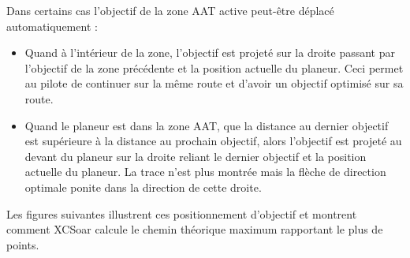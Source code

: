Dans certains cas l'objectif de la zone AAT active peut-être déplacé automatiquement :
\begin{itemize}
\item Quand à l'intérieur de la zone, l'objectif est projeté sur la droite passant par l'objectif de la zone précédente et la position actuelle du planeur. Ceci permet au pilote de continuer sur la même route et d'avoir un objectif optimisé sur sa route.  
\item Quand le planeur est dans la zone AAT, que la distance au dernier objectif est supérieure à la distance au prochain objectif, alors l'objectif est projeté au devant du planeur sur la droite reliant le dernier objectif et la position actuelle du planeur. La trace n'est plus montrée mais la flèche de direction optimale ponite dans la direction de cette droite.
\end{itemize}

Les figures suivantes illustrent ces positionnement d'objectif et montrent comment XCSoar calcule le chemin théorique maximum rapportant le plus de points.

